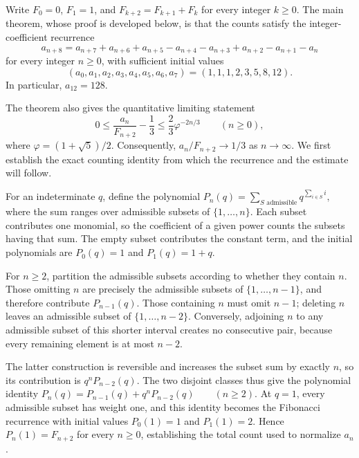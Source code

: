 \documentclass[11pt]{article}
\begin{document}
\begingroup\setlength{\fboxsep}{9pt}
\noindent{}\endgroup\par\medskip
Write $F_0=0$, $F_1=1$, and $F_{k+2}=F_{k+1}+F_k$ for every integer $k\geq 0$. The main theorem, whose proof is developed below, is that the counts satisfy the integer-coefficient recurrence
\[a_{n+8}=a_{n+7}+a_{n+6}+a_{n+5}-a_{n+4}-a_{n+3}+a_{n+2}-a_{n+1}-a_n\]
for every integer $n\geq 0$, with sufficient initial values
\[(a_0,a_1,a_2,a_3,a_4,a_5,a_6,a_7)=(1,1,1,2,3,5,8,12).\] In particular, $a_{12}=128$.

The theorem also gives the quantitative limiting statement
\[0\leq \frac{a_n}{F_{n+2}}-\frac13\leq\frac23\varphi^{-2n/3}\qquad(n\geq 0),\]
where $\varphi=(1+\sqrt5)/2$. Consequently, $a_n/F_{n+2}\to 1/3$ as $n\to\infty$. We first establish the exact counting identity from which the recurrence and the estimate will follow.

For an indeterminate $q$, define the polynomial
$P_n(q)=\sum_{S\text{ admissible}}q^{\sum_{i\in S}i},$
where the sum ranges over admissible subsets of $\{1,\ldots,n\}$. Each subset contributes one monomial, so the coefficient of a given power counts the subsets having that sum. The empty subset contributes the constant term, and the initial polynomials are $P_0(q)=1$ and $P_1(q)=1+q$.

For $n\geq 2$, partition the admissible subsets according to whether they contain $n$. Those omitting $n$ are precisely the admissible subsets of $\{1,\ldots,n-1\}$, and therefore contribute $P_{n-1}(q)$. Those containing $n$ must omit $n-1$; deleting $n$ leaves an admissible subset of $\{1,\ldots,n-2\}$. Conversely, adjoining $n$ to any admissible subset of this shorter interval creates no consecutive pair, because every remaining element is at most $n-2$.

The latter construction is reversible and increases the subset sum by exactly $n$, so its contribution is $q^nP_{n-2}(q)$. The two disjoint classes thus give the polynomial identity
$P_n(q)=P_{n-1}(q)+q^nP_{n-2}(q)\qquad(n\geq 2).$
At $q=1$, every admissible subset has weight one, and this identity becomes the Fibonacci recurrence with initial values $P_0(1)=1$ and $P_1(1)=2$. Hence $P_n(1)=F_{n+2}$ for every $n\geq 0$, establishing the total count used to normalize $a_n$.
\end{document}

